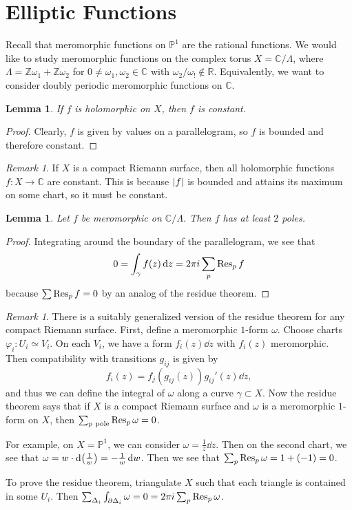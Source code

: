 \documentclass[leqno, openany]{memoir}
\newtheorem{lem}[thm]{Lemma}
\theoremstyle{definition}
\theoremstyle{remark}
\newtheorem{rmk}[thm]{Remark}
\theoremstyle{plain}
\theoremstyle{definition}
\theoremstyle{remark}
\newcommand{\R}{\mathbb{R}}
\newcommand{\C}{\mathbb{C}}
\newcommand{\Z}{\mathbb{Z}}
\renewcommand{\P}{\mathbb{P}}
\begin{document}
\section{Elliptic Functions}%
\label{sec:elliptic_functions}

Recall that meromorphic functions on $\P^1$ are the rational functions. We would like to study meromorphic functions on the complex torus $X = \C/\Lambda$, where $\Lambda = \Z \omega_1 + \Z \omega_2$ for $0 \neq \omega_1, \omega_2 \in \C$ with $\omega_2 / \omega_! \notin \R$. Equivalently, we want to consider doubly periodic meromorphic functions on $\C$.

\begin{lem}
    If $f$ is holomorphic on $X$, then $f$ is constant.
\end{lem}

\begin{proof}
    Clearly, $f$ is given by values on a parallelogram, so $f$ is bounded and therefore constant.
\end{proof}

\begin{rmk}
    If $X$ is a compact Riemann surface, then all holomorphic functions $f \colon X \to \C$ are constant. This is because $\abs{f}$ is bounded and attains its maximum on some chart, so it must be constant.
\end{rmk}

\begin{lem}
    Let $f$ be meromorphic on $\C / \Lambda$. Then $f$ has at least $2$ poles.
\end{lem}

\begin{proof}
    Integrating around the boundary of the parallelogram, we see that 
    \[ 0 = \int_{\gamma} f(z) \dd{z} = 2 \pi i \sum_{p} \Res_p f \]
    because $\sum \Res_p f = 0$ by an analog of the residue theorem.
\end{proof}

\begin{rmk}
    There is a suitably generalized version of the residue theorem for any compact Riemann surface. First, define a meromorphic $1$-form $\omega$. Choose charts $\varphi_i \colon U_i \simeq V_i$. On each $V_i$, we have a form $f_i(z) \dd{z}$ with $f_i(z)$ meromorphic. Then compatibility with transitions $g_{ij}$ is given by
    \[ f_i(z) = f_j(g_{ij}(z)) g_{ij}'(z) \dd{z}, \]
    and thus we can define the integral of $\omega$ along a curve $\gamma \subset X$. Now the residue theorem says that if $X$ is a compact Riemann surface and $\omega$ is a meromorphic $1$-form on $X$, then $\sum_{p\ \text{pole}} \Res_p \omega = 0$.

    For example, on $X = \P^1$, we can consider $\omega = \frac{1}{z} \dd{z}$. Then on the second chart, we see that $\omega = w \cdot \dd\qty(\frac{1}{w}) = -\frac{1}{w} \dd{w}$. Then we see that $\sum_p \Res_p \omega = 1 + (-1) = 0$.

    To prove the residue theorem, triangulate $X$ such that each triangle is contained in some $U_i$. Then $\sum_{\Delta_i} \int_{\partial \Delta_i} \omega = 0 = 2 \pi i \sum_p \Res_p \omega$.
\end{rmk}
\end{document}
